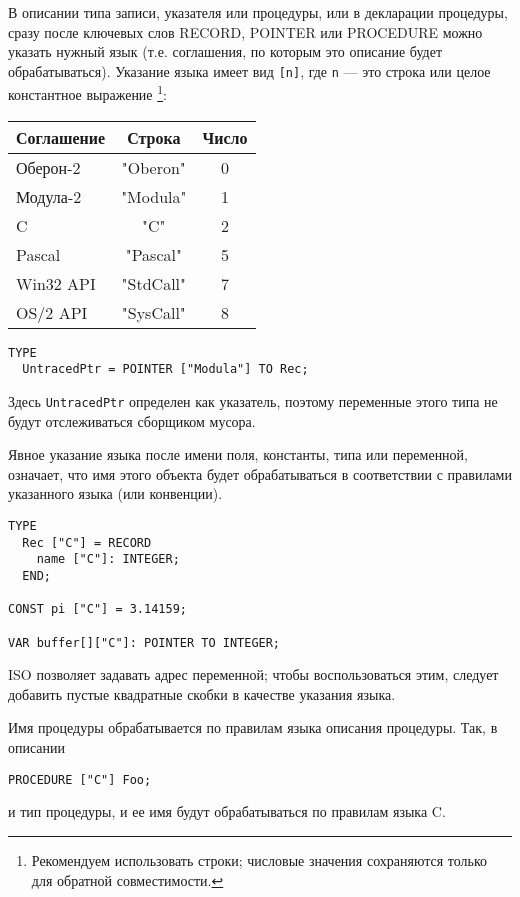 В описании типа записи, указателя или процедуры, или в декларации
процедуры, сразу после ключевых слов
RECORD, POINTER или PROCEDURE можно указать нужный язык (т.е. соглашения,
по которым это описание будет обрабатываться). Указание языка имеет вид
\verb|[n]|, где
\verb|n| --- это строка или целое константное выражение
\footnote{Рекомендуем использовать строки; числовые значения сохраняются
только для обратной совместимости.}:
\begin{center}
\begin{tabular}{|l|c|c|}
\hline
Соглашение  & Строка    & Число   \\ %
\hline
Оберон-2   & "Oberon"  & 0       \\
Модула-2   & "Modula"  & 1       \\
C          & "C"       & 2       \\
Pascal     & "Pascal"  & 5       \\
Win32 API  & "StdCall" & 7       \\
OS/2 API   & "SysCall" & 8       \\
\hline
\end{tabular}
\end{center}

\Example
\begin{verbatim}
TYPE
  UntracedPtr = POINTER ["Modula"] TO Rec;
\end{verbatim}

Здесь {\tt UntracedPtr} определен как \mt{} указатель, поэтому 
переменные этого типа не будут отслеживаться сборщиком мусора.

Явное указание языка после имени поля, константы, типа или переменной,
означает, что имя этого объекта будет обрабатываться в соответствии
с правилами указанного языка (или конвенции).
\begin{verbatim}
TYPE
  Rec ["C"] = RECORD
    name ["C"]: INTEGER;
  END;

CONST pi ["C"] = 3.14159;

VAR buffer[]["C"]: POINTER TO INTEGER;
\end{verbatim}
ISO \mt{} позволяет задавать адрес переменной; чтобы воспользоваться этим,
следует добавить пустые квадратные скобки в качестве указания языка. 

Имя процедуры обрабатывается по правилам языка описания процедуры.
Так, в описании
\begin{verbatim}
PROCEDURE ["C"] Foo;
\end{verbatim}
и тип процедуры, и ее имя будут обрабатываться по правилам языка C.

